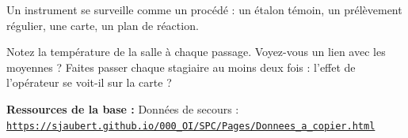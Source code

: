 \documentclass[10pt,a4paper]{article}
\begin{document}
\begin{tcolorbox}[retenir]Un instrument se surveille comme un procédé : un étalon témoin, un prélèvement régulier, une carte, un plan de réaction.\end{tcolorbox}
\begin{tcolorbox}[plus]Notez la température de la salle à chaque passage. Voyez-vous un lien avec les moyennes ? Faites passer chaque stagiaire au moins deux fois : l'effet de l'opérateur se voit-il sur la carte ?\end{tcolorbox}
\vfill{\footnotesize\color{uimm}\textbf{Ressources de la base :} Données de secours : \href{https://sjaubert.github.io/000_OI/SPC/Pages/Donnees_a_copier.html\#derive}{\nolinkurl{https://sjaubert.github.io/000_OI/SPC/Pages/Donnees_a_copier.html}}}
\end{document}

